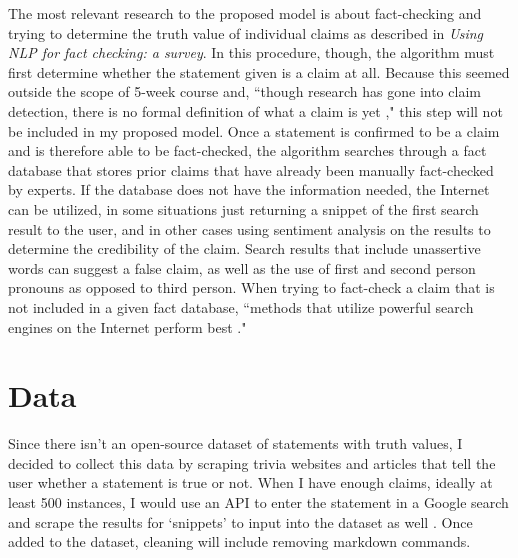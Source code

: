 \documentclass[]{article}
\begin{document}
		The most relevant research to the proposed model is about fact-checking and trying to determine the truth value of individual claims as described in \textit{Using NLP for fact checking: a survey}. In this procedure, though, the algorithm must first determine whether the statement given is a claim at all. Because this seemed outside the scope of 5-week course and, ``though research has gone into claim detection, there is no formal definition of what a claim is yet \cite{lazarski21}," this step will not be included in my proposed model. Once a statement is confirmed to be a claim and is therefore able to be fact-checked, the algorithm searches through a fact database that stores prior claims that have already been manually fact-checked by experts. If the database does not have the information needed, the Internet can be utilized, in some situations just returning a snippet of the first search result to the user, and in other cases using sentiment analysis on the results to determine the credibility of the claim. Search results that include unassertive words can suggest a false claim, as well as the use of first and second person pronouns as opposed to third person. When trying to fact-check a claim that is not included in a given fact database, ``methods that utilize powerful search engines on the Internet perform best \cite{lazarski21}."
			
	
	\section{Data}
	
		
		Since there isn't an open-source dataset of statements with truth values, I decided to collect this data by scraping trivia websites and articles that tell the user whether a statement is true or not. When I have enough claims, ideally at least 500 instances, I would use an API to enter the statement in a Google search and scrape the results for `snippets' to input into the dataset as well \cite{k_api}. Once added to the dataset, cleaning will include removing markdown commands.
		
		
\end{document}
